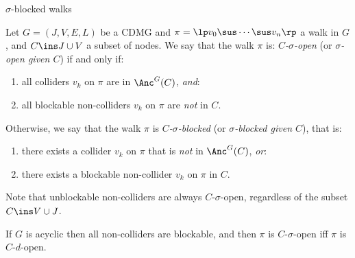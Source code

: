 \begin{frame}{$\sigma$-blocked walks}
\begin{Def}[\ref{def:sigma_blocking}]
  Let $G=(J,V,E,L)$ be a CDMG and $ \pi =\lp  v_0 \sus \cdots \sus v_n \rp $ a walk in $G$,
  and $C \ins J \cup V$ a subset of nodes.
  We say that the walk $\pi$ is:
    \emph{$C$-$\sigma$-open} (or \emph{$\sigma$-open given $C$}) if and only if:
  \begin{enumerate}
      \item all colliders $v_k$ on $\pi$ are in $\Anc^G(C)$, \emph{and}:
    \item all blockable non-colliders $v_k$ on $\pi$ are \emph{not} in $C$.
  \end{enumerate}
  Otherwise, we say that the walk $\pi$ is
  \emph{$C$-$\sigma$-blocked}  (or \emph{$\sigma$-blocked given $C$}), that is:
  \begin{enumerate}
    \item there exists a collider $v_k$ on $\pi$ that is \emph{not} in $\Anc^G(C)$, \emph{or}:
    \item there exists a blockable non-collider $v_k$ on $\pi$ in $C$.
  \end{enumerate}  
  Note that unblockable non-colliders are always $C$-$\sigma$-open, regardless of the subset $C \ins V \cup J$.
\end{Def}
If $G$ is acyclic then all non-colliders are blockable, and then $\pi$ is $C$-$\sigma$-open iff $\pi$ is $C$-$d$-open.
\end{frame}


